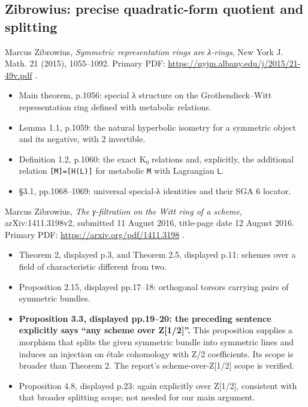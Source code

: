 \documentclass[
  10pt,
]{article}
\providecommand{\tightlist}{%
  \setlength{\itemsep}{0pt}\setlength{\parskip}{0pt}}
\providecommand{\tightlist}{\setlength{\itemsep}{0pt}\setlength{\parskip}{0pt}}
\begin{document}
\subsection{Zibrowius: precise quadratic-form quotient and
splitting}\label{zibrowius-precise-quadratic-form-quotient-and-splitting}

Marcus Zibrowius, \emph{Symmetric representation rings are λ-rings}, New
York J. Math. 21 (2015), 1055--1092. Primary PDF:
\url{https://nyjm.albany.edu/j/2015/21-49v.pdf} .

\begin{itemize}
\tightlist
\item
  Main theorem, p.1056: special λ structure on the Grothendieck--Witt
  representation ring defined with metabolic relations.
\item
  Lemma 1.1, p.1059: the natural hyperbolic isometry for a symmetric
  object and its negative, with 2 invertible.
\item
  Definition 1.2, p.1060: the exact K₀ relations and, explicitly, the
  additional relation
  \texttt{\small [\allowbreak{}M]\allowbreak{}=\allowbreak{}[\allowbreak{}H(\allowbreak{}L)\allowbreak{}]\allowbreak{}}
  for metabolic \texttt{\small M} with Lagrangian \texttt{\small L}.
\item
  §3.1, pp.1068--1069: universal special-λ identities and their SGA 6
  locator.
\end{itemize}

Marcus Zibrowius, \emph{The γ-filtration on the Witt ring of a scheme},
arXiv:1411.3198v2, submitted 11 August 2016, title-page date 12 August
2016. Primary PDF: \url{https://arxiv.org/pdf/1411.3198} .

\begin{itemize}
\tightlist
\item
  Theorem 2, displayed p.3, and Theorem 2.5, displayed p.11: schemes
  over a field of characteristic different from two.
\item
  Proposition 2.15, displayed pp.17--18: orthogonal torsors carrying
  pairs of symmetric bundles.
\item
  \textbf{Proposition 3.3, displayed pp.19--20: the preceding sentence
  explicitly says ``any scheme over Z{[}1/2{]}''.} This proposition
  supplies a morphism that splits the given symmetric bundle into
  symmetric lines and induces an injection on étale cohomology with Z/2
  coefficients. Its scope is broader than Theorem 2. The report's
  scheme-over-Z{[}1/2{]} scope is verified.
\item
  Proposition 4.8, displayed p.23: again explicitly over Z{[}1/2{]},
  consistent with that broader splitting scope; not needed for our main
  argument.
\end{itemize}
\end{document}
